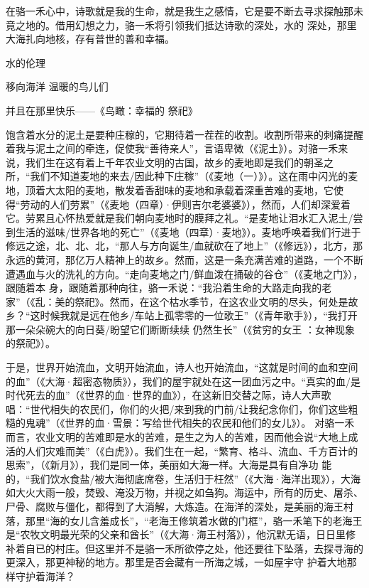 \documentclass{article}
\begin{document}
在骆一禾心中，诗歌就是我的生命，就是我生之感情，它是要不断去寻求探触那未竟之地的。借用幻想之力，骆一禾将引领我们抵达诗歌的深处，水的
深处，那里大海扎向地核，存有普世的善和幸福。 


    水的伦理 

    移向海洋  温暖的鸟儿们
    
\newpage

    并且在那里快乐——《鸟瞰：幸福的
祭祀》 

饱含着水分的泥土是要种庄稼的，它期待着一茬茬的收割。收割所带来的刺痛提醒着我与泥土之间的牵连，促使我“善待亲人”，言语卑微（《泥土》）。对骆一禾来说，我们生在这有着上千年农业文明的古国，故乡的麦地即是我们的朝圣之所，“我们不知道麦地的来去/因此种下庄稼”（《麦地（一）》）。这在雨中闪光的麦地，顶着大太阳的麦地，散发着香甜味的麦地和承载着深重苦难的麦地，它使得“劳动的人们劳累”（《麦地（四章）·伊则吉尔老婆婆》），然而，人们却深爱着它。劳累且心怀热爱就是我们朝向麦地时的膜拜之礼。“是麦地让泪水汇入泥土/尝到生活的滋味/世界各地的死亡”（《麦地（四章）·麦地》）。麦地呼唤着我们行进于修远之途，北、北、北，“那人与方向诞生/血就砍在了地上”（《修远》），北方，那永远的黄河，那亿万人精神上的故乡。然而，这是一条充满苦难的道路，一个不断遭遇血与火的洗礼的方向。“走向麦地之门/鲜血泼在捅破的谷仓”（《麦地之门》），跟随着本
\newpage
身，跟随着那种向往，骆一禾说：“我沿着生命的大路走向我的老家”（《乱：美的祭祀》。然而，在这个枯水季节，在这农业文明的尽头，何处是故乡？“这时候我就是远在他乡/车站上孤零零的一位歌王”（《青年歌手》），“我打开那一朵朵碗大的向日葵/盼望它们断断续续  仍然生长”（《贫穷的女王
：女神现象的祭祀》）。 

于是，世界开始流血，文明开始流血，诗人也开始流血，“这就是时间的血和空间的血”（《大海·超密态物质》），我们的屋宇就处在这一团血污之中。“真实的血/是时代死去的血”（《世界的血·世界的血》），在这新旧交替之际，诗人大声歌唱：“世代相失的农民们，你们的火把/来到我的门前/让我纪念你们，你们这些粗糙的鬼魂”（《世界的血·雪景：写给世代相失的农民和他们的女儿》）。
对骆一禾而言，农业文明的苦难即是水的苦难，是生之为人的苦难，因而他会说“大地上成活的人们灾难而美”（《白虎》）。我们生在一起，“繁育、格斗、流血、千方百计的思索”，（《新月》），我们是同一体，美丽如大海一样。大海是具有自净功
\newpage
能的，“我们饮水食盐/被大海彻底席卷，生活归于枉然”（《大海·海洋出现》），大海如大火大雨一般，焚毁、淹没万物，并视之如刍狗。海运中，所有的历史、屠杀、尸骨、腐败与僵化，都得到了大消解，大炼造。在海洋的深处，是美丽的海王村落，那里“海的女儿含羞成长”，“老海王修筑着水做的门框”，骆一禾笔下的老海王是“农牧文明最光荣的父亲和酋长”（《大海·海王村落》），他沉默无语，日日里修补着自已的村庄。但这里并不是骆一禾所欲停之处，他还要往下坠落，去探寻海的更深入，那更神秘的地方。那里是否会藏有一所海之城，一如屋宇守
护着大地那样守护着海洋？ 
\end{document}
